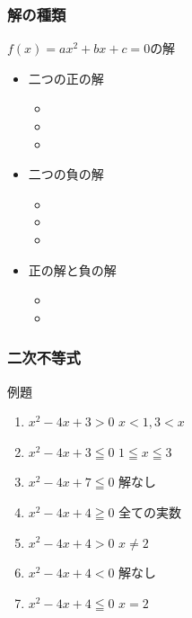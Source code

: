 \documentclass[10pt,dvipdfmx]{jsarticle}
\newcommand{\answer}[2]{{\color{orange}#2}}
\newcommand{\answer}[2]{\vspace{#1mm}}
\begin{document}
\subsubsection*{解の種類}
$f(x)=ax^2+bx+c=0$の解
\begin{multicols}{3}
  \begin{large}
    \begin{itemize}
      \item 二つの正の解
            \begin{itemize}
              \item \item \item
            \end{itemize}
      \item 二つの負の解
            \begin{itemize}
              \item \item \item
            \end{itemize}
      \item 正の解と負の解
            \begin{itemize}
              \item \item
            \end{itemize}
    \end{itemize}
  \end{large}
\end{multicols}

\subsubsection*{二次不等式}
\begin{itembox}[l]{例題}
  \begin{large}
    \begin{multicols}{2}
      \begin{enumerate}
        \item $x^2-4x+3>0$  \answer{10}{$x<1, 3<x$}
        \item $x^2-4x+3\leqq0$ \answer{10}{$1\leqq x\leqq 3$}
        \item $x^2-4x+7\leqq0$ \answer{10}{$解なし$}
        \item $x^2-4x+4\geqq0$ \answer{10}{$全ての実数$}
        \item $x^2-4x+4>0$ \answer{10}{$x\not=2$}
        \item  $x^2-4x+4<0$ \answer{10}{$解なし$}
        \item $x^2-4x+4\leqq0$ \answer{10}{$x=2$}
      \end{enumerate}
    \end{multicols}
  \end{large}

\end{itembox}
\end{document}
